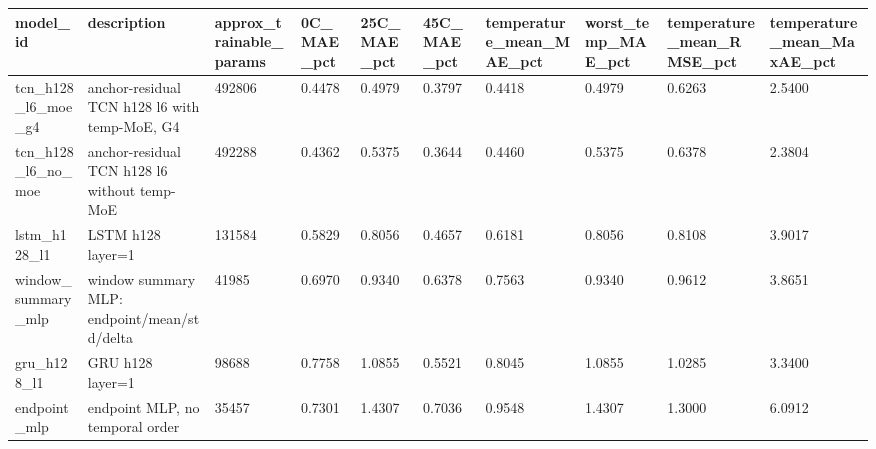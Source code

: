\begin{tabular}{llllllllll}
\hline
model_id & description & approx_trainable_params & 0C_MAE_pct & 25C_MAE_pct & 45C_MAE_pct & temperature_mean_MAE_pct & worst_temp_MAE_pct & temperature_mean_RMSE_pct & temperature_mean_MaxAE_pct \\
\hline
tcn_h128_l6_moe_g4 & anchor-residual TCN h128 l6 with temp-MoE, G4 & 492806 & 0.4478 & 0.4979 & 0.3797 & 0.4418 & 0.4979 & 0.6263 & 2.5400 \\
tcn_h128_l6_no_moe & anchor-residual TCN h128 l6 without temp-MoE & 492288 & 0.4362 & 0.5375 & 0.3644 & 0.4460 & 0.5375 & 0.6378 & 2.3804 \\
lstm_h128_l1 & LSTM h128 layer=1 & 131584 & 0.5829 & 0.8056 & 0.4657 & 0.6181 & 0.8056 & 0.8108 & 3.9017 \\
window_summary_mlp & window summary MLP: endpoint/mean/std/delta & 41985 & 0.6970 & 0.9340 & 0.6378 & 0.7563 & 0.9340 & 0.9612 & 3.8651 \\
gru_h128_l1 & GRU h128 layer=1 & 98688 & 0.7758 & 1.0855 & 0.5521 & 0.8045 & 1.0855 & 1.0285 & 3.3400 \\
endpoint_mlp & endpoint MLP, no temporal order & 35457 & 0.7301 & 1.4307 & 0.7036 & 0.9548 & 1.4307 & 1.3000 & 6.0912 \\
\hline
\end{tabular}
